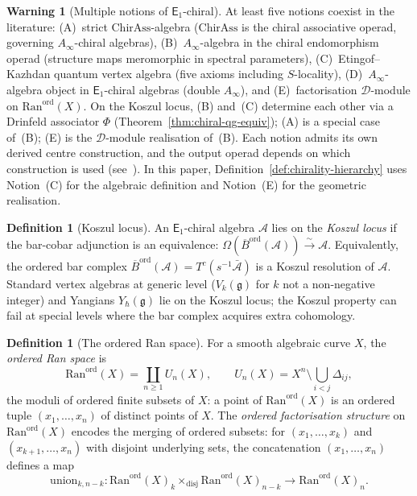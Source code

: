 \documentclass[11pt,reqno]{amsart}
\theoremstyle{definition}
\newtheorem{definition}[theorem]{Definition}
\newtheorem{warning}[theorem]{Warning}
\theoremstyle{remark}
\newcommand{\cA}{\mathcal{A}}
\newcommand{\cD}{\mathcal{D}}
\newcommand{\Ran}{\mathrm{Ran}}
\newcommand{\Ainf}{A_{\infty}}
\newcommand{\Eone}{\mathsf{E}_{1}}
\newcommand{\fg}{\mathfrak{g}}
\newcommand{\Barord}{\overline{B}^{\mathrm{ord}}}
\numberwithin{equation}{section}
\begin{document}
\begin{warning}[Multiple notions of $\Eone$-chiral]
\label{warn:multiple-e1-notions}
At least five notions coexist in the literature:
\textup{(A)}~strict $\mathrm{ChirAss}$-algebra
($\mathrm{ChirAss}$ is the chiral associative operad,
governing $\Ainf$-chiral algebras),
\textup{(B)}~$\Ainf$-algebra in the chiral endomorphism operad
\textup{(}structure maps meromorphic in spectral parameters\textup{)},
\textup{(C)}~Etingof--Kazhdan quantum vertex algebra
\textup{(}five axioms including $S$-locality\textup{)},
\textup{(D)}~$\Ainf$-algebra object in $\Eone$-chiral algebras
\textup{(}double $\Ainf$\textup{)}, and
\textup{(E)}~factorisation $\cD$-module on
$\Ran^{\mathrm{ord}}(X)$.
On the Koszul locus, \textup{(B)} and~\textup{(C)} determine
each other via a Drinfeld associator $\Phi$
\textup{(}Theorem~\textup{\ref{thm:chiral-qg-equiv}}\textup{)};
\textup{(A)} is a special case of~\textup{(B)};
\textup{(E)} is the $\cD$-module realisation of~\textup{(B)}.
Each notion admits its own derived centre construction, and
the output operad depends on which construction is used
\textup{(}see~\cite[Warning~2.21]{Lorgat26I}\textup{)}.
In this paper, Definition~\textup{\ref{def:chirality-hierarchy}}
uses Notion~\textup{(C)} for the algebraic definition and
Notion~\textup{(E)} for the geometric realisation.
\end{warning}

\begin{definition}[Koszul locus]
\label{def:koszul-locus}
An $\Eone$-chiral algebra $\cA$ lies on the
\emph{Koszul locus} if the bar-cobar adjunction is an
equivalence:
$\Omega(\Barord(\cA)) \xrightarrow{\;\sim\;} \cA$.
Equivalently, the ordered bar complex
$\Barord(\cA) = T^c(s^{-1}\bar{\cA})$ is a Koszul
resolution of $\cA$.
Standard vertex algebras at generic level
\textup{(}$V_k(\fg)$ for $k$ not a non-negative
integer\textup{)} and Yangians $Y_\hbar(\fg)$ lie on
the Koszul locus; the Koszul property can fail at
special levels where the bar complex acquires extra
cohomology.
\end{definition}

\begin{definition}[The ordered Ran space]
\label{def:ran-ord}
For a smooth algebraic curve $X$, the \emph{ordered Ran
space} is
\[
  \Ran^{\mathrm{ord}}(X) = \coprod_{n \geq 1} U_n(X), \qquad
  U_n(X) = X^n \setminus \bigcup_{i<j} \Delta_{ij},
\]
the moduli of ordered finite subsets of $X$: a point of
$\Ran^{\mathrm{ord}}(X)$ is an ordered tuple
$(x_1, \ldots, x_n)$ of distinct points of $X$.
The \emph{ordered factorisation structure} on
$\Ran^{\mathrm{ord}}(X)$ encodes the merging of ordered
subsets: for $(x_1, \ldots, x_k)$ and
$(x_{k+1}, \ldots, x_n)$ with disjoint underlying sets,
the concatenation $(x_1, \ldots, x_n)$ defines a map
\[
  \mathrm{union}_{k,n-k} \colon
  \Ran^{\mathrm{ord}}(X)_k
  \times_{\mathrm{disj}}
  \Ran^{\mathrm{ord}}(X)_{n-k}
  \to \Ran^{\mathrm{ord}}(X)_n.
\]
\end{definition}
\end{document}
